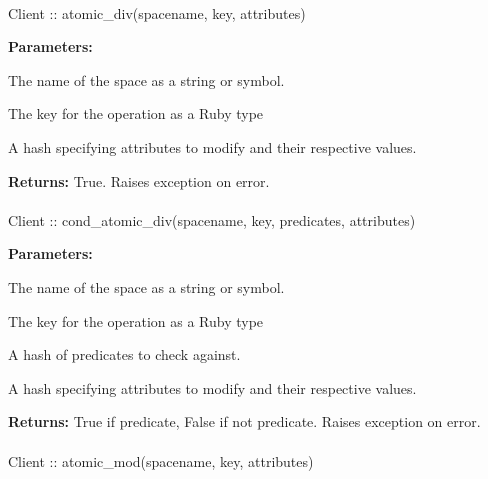 \paragraph{}
\begin{ccode}
Client :: atomic_div(spacename, key, attributes)
\end{ccode}
\funcdesc 

\noindent\textbf{Parameters:}
\begin{description}[labelindent=\widthof{{\code{attributes}}},leftmargin=*,noitemsep,nolistsep,align=right]
\item[\code{spacename}] The name of the space as a string or symbol.
\item[\code{key}] The key for the operation as a Ruby type
\item[\code{attributes}] A hash specifying attributes to modify and their respective values.
\end{description}

\noindent\textbf{Returns:}
True.  Raises exception on error.

\paragraph{}
\begin{ccode}
Client :: cond_atomic_div(spacename, key, predicates, attributes)
\end{ccode}
\funcdesc 

\noindent\textbf{Parameters:}
\begin{description}[labelindent=\widthof{{\code{predicates}}},leftmargin=*,noitemsep,nolistsep,align=right]
\item[\code{spacename}] The name of the space as a string or symbol.
\item[\code{key}] The key for the operation as a Ruby type
\item[\code{predicates}] A hash of predicates to check against.
\item[\code{attributes}] A hash specifying attributes to modify and their respective values.
\end{description}

\noindent\textbf{Returns:}
True if predicate, False if not predicate.  Raises exception on error.

\paragraph{}
\begin{ccode}
Client :: atomic_mod(spacename, key, attributes)
\end{ccode}
\funcdesc 

